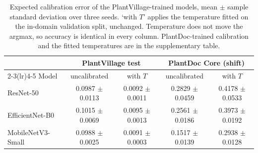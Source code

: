 \begin{table}[htbp]
\caption{Expected calibration error of the PlantVillage-trained models, mean $\pm$ sample standard deviation over three seeds. `with $T$' applies the temperature fitted on the in-domain validation split, unchanged. Temperature does not move the argmax, so accuracy is identical in every column. PlantDoc-trained calibration and the fitted temperatures are in the supplementary table.}
\label{tab:calibration-compact}
\scriptsize
\centering
\setlength{\tabcolsep}{5pt}
\begin{tabular}{lcccc}
\toprule
 & \multicolumn{2}{c}{PlantVillage test} & \multicolumn{2}{c}{PlantDoc Core (shift)} \\
\cmidrule(lr){2-3}\cmidrule(lr){4-5}
Model & uncalibrated & with $T$ & uncalibrated & with $T$ \\
\midrule
ResNet-50 & 0.0987 $\pm$ 0.0113 & 0.0092 $\pm$ 0.0011 & 0.2829 $\pm$ 0.0459 & 0.4178 $\pm$ 0.0533 \\
EfficientNet-B0 & 0.1015 $\pm$ 0.0069 & 0.0095 $\pm$ 0.0013 & 0.2561 $\pm$ 0.0186 & 0.3973 $\pm$ 0.0192 \\
MobileNetV3-Small & 0.0988 $\pm$ 0.0025 & 0.0091 $\pm$ 0.0003 & 0.1517 $\pm$ 0.0139 & 0.2938 $\pm$ 0.0128 \\
\bottomrule
\end{tabular}
\end{table}
